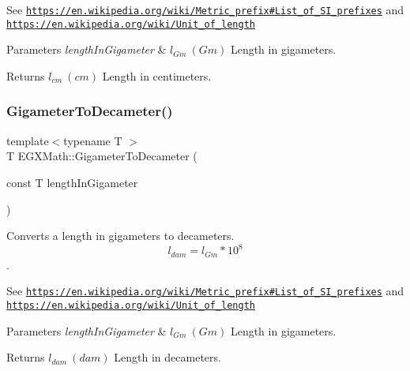 See \href{https://en.wikipedia.org/wiki/Metric_prefix#List_of_SI_prefixes}{\tt https\+://en.\+wikipedia.\+org/wiki/\+Metric\+\_\+prefix\#\+List\+\_\+of\+\_\+\+S\+I\+\_\+prefixes} and \href{https://en.wikipedia.org/wiki/Unit_of_length}{\tt https\+://en.\+wikipedia.\+org/wiki/\+Unit\+\_\+of\+\_\+length} 
\begin{DoxyParams}{Parameters}
{\em length\+In\+Gigameter} & $ l_{Gm}\ (Gm)$ Length in gigameters. \\
\hline
\end{DoxyParams}
\begin{DoxyReturn}{Returns}
$ l_{cm}\ (cm)$ Length in centimeters. 
\end{DoxyReturn}
\mbox{\label{group___e_g_x_math-_conversions-_length_conversions-_s_i-_gigameter-_s_i_gab0233167d63c136801ae42faabe64263}} 
\subsubsection{\texorpdfstring{Gigameter\+To\+Decameter()}{GigameterToDecameter()}}
{\footnotesize\ttfamily template$<$typename T $>$ \\
T E\+G\+X\+Math\+::\+Gigameter\+To\+Decameter (\begin{DoxyParamCaption}\item[{const T}]{length\+In\+Gigameter }\end{DoxyParamCaption})}



Converts a length in gigameters to decameters. \[ l_{dam}=l_{Gm} * 10^{8} \]. 

See \href{https://en.wikipedia.org/wiki/Metric_prefix#List_of_SI_prefixes}{\tt https\+://en.\+wikipedia.\+org/wiki/\+Metric\+\_\+prefix\#\+List\+\_\+of\+\_\+\+S\+I\+\_\+prefixes} and \href{https://en.wikipedia.org/wiki/Unit_of_length}{\tt https\+://en.\+wikipedia.\+org/wiki/\+Unit\+\_\+of\+\_\+length} 
\begin{DoxyParams}{Parameters}
{\em length\+In\+Gigameter} & $ l_{Gm}\ (Gm)$ Length in gigameters. \\
\hline
\end{DoxyParams}
\begin{DoxyReturn}{Returns}
$ l_{dam}\ (dam)$ Length in decameters. 
\end{DoxyReturn}
\mbox{\label{group___e_g_x_math-_conversions-_length_conversions-_s_i-_gigameter-_s_i_ga9333dddd3642cf160b026516dd760576}} 

